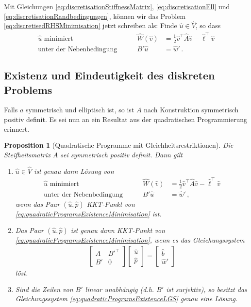 \documentclass{scrartcl}
\newcounter{everything}
\newtheorem{proposition}[everything]{Proposition}
\newcommand{\hu}{\hat{u}}
\newcommand{\hv}{\hat{v}}
\newcommand{\hA}{\hat{A}}
\newcommand{\hb}{\hat{b}}
\newcommand{\hw}{\hat{w}}
\newcommand{\hW}{\hat{W}}
\newcommand{\hV}{\hat{V}}
\newcommand{\hp}{\hat{p}}
\newcommand{\hl}{\hat{\ell}}
\newcommand{\vect}[1]{\begin{bmatrix} #1 \end{bmatrix}}
\begin{document}
Mit Gleichungen \eqref{eq:discretisationStiffnessMatrix}, \eqref{eq:discretisationEll} und \eqref{eq:discretisationRandbedingungen}, können wir das Problem \eqref{eq:discretisedRHSMinimisation} jetzt schreiben als: Finde $\hu\in\hV$, so dass
\begin{equation*}
	\begin{aligned}
		\hu\text{ minimiert } \quad&&\hW(\hv)&=\frac{1}{2}\hv^\top\hA\hv-\hl^\top\hv \\
		\text{unter der Nebenbedingung }\quad&&B'\hu &= \hw'\,.
	\end{aligned}
\end{equation*}


\subsection{Existenz und Eindeutigkeit des diskreten Problems}
Falls $a$ symmetrisch und elliptisch ist, so ist $A$ nach Konstruktion symmetrisch positiv definit.
Es sei nun an ein Resultat aus der quadratischen Programmierung erinnert.
\begin{proposition}[Quadratische Programme mit Gleichheitsrestriktionen]
	Die Steifheitsmatrix $A$ sei symmetrisch positiv definit. Dann gilt
	\begin{enumerate}
		\item
		$\hu\in\hV$ ist genau dann Lösung von
		\begin{equation}
			\begin{aligned}
				\hu\text{ minimiert } \quad&&\hW(\hv)&=\frac{1}{2}\hv^\top\hA\hv-\hl^\top\hv \\
				\text{unter der Nebenbedingung }\quad&&B'\hu &= \hw'\,,
			\end{aligned}
				\label{eq:quadraticProgramsExistenceMinimisation}
		\end{equation}		
		wenn das Paar $(\hu,\hp)$ KKT-Punkt von \eqref{eq:quadraticProgramsExistenceMinimisation} ist.
		\item
		Das Paar $(\hu,\hp)$ ist genau dann KKT-Punkt von \eqref{eq:quadraticProgramsExistenceMinimisation}, wenn es das Gleichungssystem
		\begin{align}
			\begin{bmatrix}
				A & B'^\top \\
				B' & 0
			\end{bmatrix}
			\vect{\hu \\ \hp}
			= \vect{\hb \\ \hw'}
			\label{eq:quadraticProgramsExistenceLGS}
		\end{align}
		löst.
		\item
		Sind die Zeilen von $B'$ linear unabhängig (d.h. $B'$ ist surjektiv), so besitzt das Gleichungssystem \eqref{eq:quadraticProgramsExistenceLGS} genau eine Lösung.
	\end{enumerate}
\end{proposition}
\end{document}
